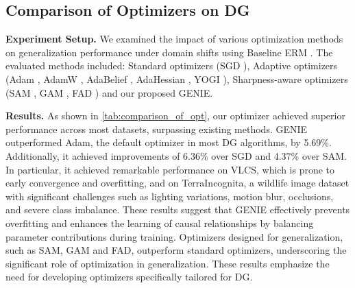 \documentclass{article}
\theoremstyle{plain}
\theoremstyle{definition}
\theoremstyle{remark}
\begin{document}
\subsection{Comparison of Optimizers on DG}
\label{Sec-4:Comparison of Optimizers on DG}
\textbf{Experiment Setup.} We examined the impact of various optimization methods on generalization performance under domain shifts using Baseline ERM \cite{erm}. The evaluated methods included: Standard optimizers (SGD \cite{sgd}), Adaptive optimizers (Adam \cite{adam}, AdamW \cite{adamw}, AdaBelief \cite{adabelief}, AdaHessian \cite{adahessian},  YOGI \cite{yogi}), Sharpness-aware optimizers (SAM \cite{sam}, GAM \cite{gam}, FAD \cite{dg_opt}) and our proposed GENIE. 

\textbf{Results.} As shown in \cref{tab:comparison_of_opt}, our optimizer achieved superior performance across most datasets, surpassing existing methods. 
GENIE outperformed Adam, the default optimizer in most DG algorithms\cite{dg_opt}, by 5.69\%. Additionally, it achieved improvements of 6.36\% over SGD and 4.37\% over SAM. In particular, it achieved remarkable performance on VLCS, which is prone to early convergence and overfitting\cite{vlcs_fast_conv}, and on TerraIncognita, a wildlife image dataset with significant challenges such as lighting variations, motion blur, occlusions, and severe class imbalance\cite{terra}. These results suggest that GENIE effectively prevents overfitting and enhances the learning of causal relationships by balancing parameter contributions during training. Optimizers designed for generalization, such as SAM, GAM and FAD, outperform standard optimizers, underscoring the significant role of optimization in generalization. These results emphasize the need for developing optimizers specifically tailored for DG. 
\end{document}
